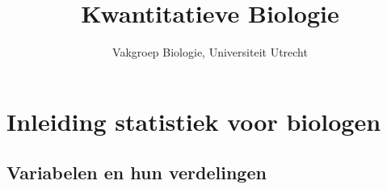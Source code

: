 \documentclass[
  a4paper,
]{scrbook}
\title{Kwantitatieve Biologie}
\author{Vakgroep Biologie, Universiteit Utrecht}
\date{}
\renewcommand*\contentsname{Inhoudsopgave}
\newcommand\contentsname{Inhoudsopgave}
\theoremstyle{definition}
\theoremstyle{definition}
\theoremstyle{remark}
\begin{document}
\frontmatter
\maketitle

\renewcommand*\contentsname{Inhoudsopgave}
{
\setcounter{tocdepth}{1}
\tableofcontents
}

\mainmatter
\part{Inleiding statistiek voor biologen}

\chapter{Variabelen en hun
verdelingen}\label{variabelen-en-hun-verdelingen}

\renewcommand{\ttdefault}{lcmtt}
\providecommand{\ped}[1]{_\textrm{#1}}
\providecommand{\ap}[1]{^\textrm{#1}}
\providecommand{\app}[1]{^\textrm{#1}}

\providecommand*{\angs}{\smash{\mathrm{\ring A}}}
\providecommand*{\celsius}{\mathrm{~\circ C}}
\providecommand*{\micro}{\mu}

\providecommand*{\unit}[1]{\textrm{\,#1}}

\providecommand{\E}{\mathrm{e}}
\providecommand{\I}{\mathrm{i}}
\providecommand{\sfrac}[2]{^{#1}/_{#2}}

\providecommand{\conc}[1]{\left[\mathrm{#1}\right]}

\providecommand{\command}[1]{\textsl{#1}}
\providecommand{\out}[1]{\begin{verbatim}#1\end{verbatim}}

\providecommand{\diff}{\mathrm{d}\,}

\providecommand*{\deriv}[3][]{%
    \frac{\diff^{#1}#2}{\diff #3^{#1}}}
\providecommand*{\pderiv}[3][]{%
    \frac{\partial^{#1}#2}
        {\partial #3^{#1}}}

\renewcommand{\vec}[1]{{\boldsymbol #1}}

\providecommand{\cov}[2]{\mathrm{Cov}\!\left(#1, #2\right)}
\providecommand{\var}[1]{\mathrm{Var}\!\left(#1\right)}

\providecommand{\mean}[1]{\overline{#1}}

\providecommand{\sd}[1]{\sigma\left(#1\right)}
\providecommand{\ev}[1]{\mathbb{E}\!\left(#1\right)}
\providecommand{\pr}[1]{\textrm{Pr}\!\left(#1\right)}
\end{document}

